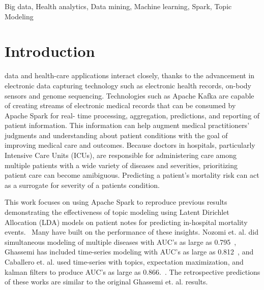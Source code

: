 \documentclass[journal]{IEEEtran}
\begin{document}
\begin{IEEEkeywords}
Big data, Health analytics, Data mining, Machine learning, Spark, Topic Modeling
\end{IEEEkeywords}
%
\IEEEpeerreviewmaketitle



\section{Introduction}
 data and health-care applications interact closely, thanks to the advancement in electronic data capturing technology such as electronic health records, on-body sensors and genome sequencing.  Technologies such as Apache Kafka are capable of creating streams of electronic medical records that can be consumed by Apache Spark for real- time processing, aggregation, predictions, and reporting of patient information.  This information can help augment medical practitioners’ judgments and understanding about patient conditions with the goal of improving medical care and outcomes.  Because doctors in hospitals, particularly Intensive Care Units (ICUs), are responsible for administering care among multiple patients with a wide variety of diseases and severities, prioritizing patient care can become amibiguous.  Predicting a patient's mortality risk can act as a surrogate for severity of a patients condition.

This work focuses on using Apache Spark to reproduce previous results demonstrating the effectiveness of topic modeling using Latent Dirichlet Allocation (LDA) models on patient notes for predicting in-hospital mortality events.~\cite{ghassemi_unfolding_2014}  Many have built on the performance of these insights.  Nozomi et. al. did simultaneous modeling of multiple diseases with AUC's as large as 0.795~\cite{mozomi_2015}, Ghassemi has included time-series modeling with AUC's as large as 0.812~\cite{ghassemi_2015}, and Caballero et. al. used time-series with topics, expectation maximization, and kalman filters to produce AUC's as large as 0.866.~\cite{caballero_2015}.  The retrospective predictions of these works are similar to the original Ghassemi et. al. results.  
\end{document}
